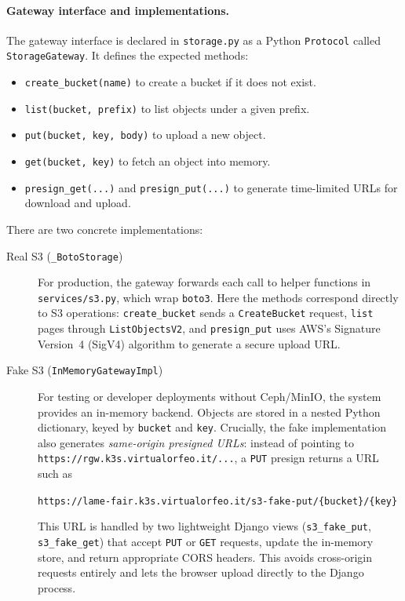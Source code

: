 \paragraph{Gateway interface and implementations.}
The gateway interface is declared in \texttt{storage.py} as a Python \texttt{Protocol} called \texttt{StorageGateway}.  
It defines the expected methods:
\begin{itemize}
	\item \texttt{create\_bucket(name)} to create a bucket if it does not exist.  
	\item \texttt{list(bucket, prefix)} to list objects under a given prefix.  
	\item \texttt{put(bucket, key, body)} to upload a new object.  
	\item \texttt{get(bucket, key)} to fetch an object into memory.  
	\item \texttt{presign\_get(...)} and \texttt{presign\_put(...)} to generate time-limited URLs for download and upload.  
\end{itemize}

There are two concrete implementations:
\begin{description}
	\item[Real S3 (\texttt{\_BotoStorage})]  
	For production, the gateway forwards each call to helper functions in \texttt{services/s3.py}, which wrap \texttt{boto3}.  
	Here the methods correspond directly to S3 operations: \texttt{create\_bucket} sends a \texttt{CreateBucket} request, 
	\texttt{list} pages through \texttt{ListObjectsV2}, and \texttt{presign\_put} uses AWS’s Signature Version~4 (SigV4) algorithm 
	to generate a secure upload URL.
	
	\item[Fake S3 (\texttt{InMemoryGatewayImpl})]  
	For testing or developer deployments without Ceph/MinIO, the system provides an in-memory backend.  
	Objects are stored in a nested Python dictionary, keyed by \texttt{bucket} and \texttt{key}.  
	Crucially, the fake implementation also generates \emph{same-origin presigned URLs}: instead of pointing to 
	\texttt{https://rgw.k3s.virtualorfeo.it/...}, a \texttt{PUT} presign returns a URL such as
	\begin{center}
		\texttt{https://lame-fair.k3s.virtualorfeo.it/s3-fake-put/\{bucket\}/\{key\}}
	\end{center}
	This URL is handled by two lightweight Django views (\texttt{s3\_fake\_put}, \texttt{s3\_fake\_get}) 
	that accept \texttt{PUT} or \texttt{GET} requests, update the in-memory store, and return appropriate CORS headers.  
	This avoids cross-origin requests entirely and lets the browser upload directly to the Django process.  
\end{description}

